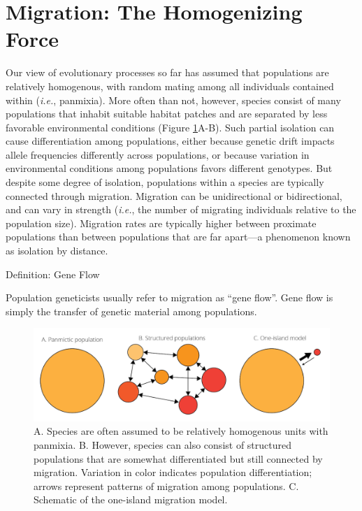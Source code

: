 \documentclass[
]{book}
\begin{document}
\hypertarget{migration-the-homogenizing-force}{%
\section{Migration: The Homogenizing Force}\label{migration-the-homogenizing-force}}

Our view of evolutionary processes so far has assumed that populations are relatively homogenous, with random mating among all individuals contained within (\emph{i.e.}, panmixia). More often than not, however, species consist of many populations that inhabit suitable habitat patches and are separated by less favorable environmental conditions (Figure \ref{fig:popstructure}A-B). Such partial isolation can cause differentiation among populations, either because genetic drift impacts allele frequencies differently across populations, or because variation in environmental conditions among populations favors different genotypes. But despite some degree of isolation, populations within a species are typically connected through migration. Migration can be unidirectional or bidirectional, and can vary in strength (\emph{i.e.}, the number of migrating individuals relative to the population size). Migration rates are typically higher between proximate populations than between populations that are far apart---a phenomenon known as isolation by distance.

Definition: Gene Flow

Population geneticists usually refer to migration as ``gene flow''. Gene flow is simply the transfer of genetic material among populations.

\begin{figure}
\includegraphics[width=1\linewidth]{images/popstructure} \caption{A. Species are often assumed to be relatively homogenous units with panmixia. B. However, species  can also consist of structured populations that are somewhat differentiated but still connected by migration. Variation in color indicates population differentiation; arrows represent patterns of migration among populations. C. Schematic of the one-island migration model.}\label{fig:popstructure}
\end{figure}
\end{document}
